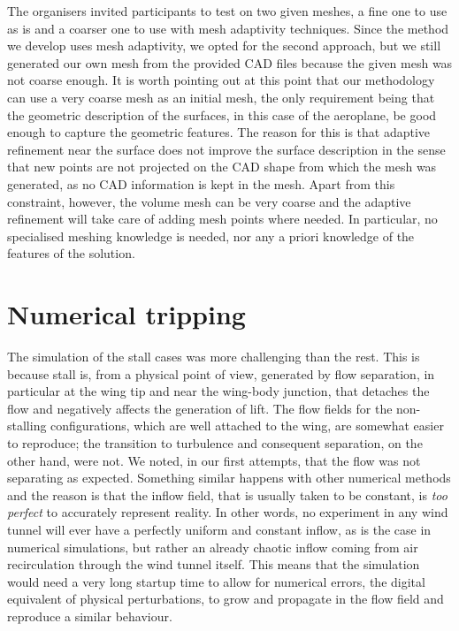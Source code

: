 The organisers invited participants to test on two given meshes, a fine one to use as is and a coarser one to use with mesh adaptivity techniques.
Since the method we develop uses mesh adaptivity, we opted for the second approach, but we still generated our own mesh from the provided CAD files because the given mesh was not coarse enough.
It is worth pointing out at this point that our methodology can use a very coarse mesh as an initial mesh, the only requirement being that the geometric description of the surfaces, in this case of the aeroplane, be good enough to capture the geometric features.
The reason for this is that adaptive refinement near the surface does not improve the surface description in the sense that new points are not projected on the CAD shape from which the mesh was generated, as no CAD information is kept in the mesh.
Apart from this constraint, however, the volume mesh can be very coarse and the adaptive refinement will take care of adding mesh points where needed.
In particular, no specialised meshing knowledge is needed, nor any a priori knowledge of the features of the solution.

\section{Numerical tripping}
\label{sec_tripping}
The simulation of the stall cases was more challenging than the rest.
This is because stall is, from a physical point of view, generated by flow separation, in particular at the wing tip and near the wing-body junction, that detaches the flow and negatively affects the generation of lift.
The flow fields for the non-stalling configurations, which are well attached to the wing, are somewhat easier to reproduce; the transition to turbulence and consequent separation, on the other hand, were not.
We noted, in our first attempts, that the flow was not separating as expected.
Something similar happens with other numerical methods and the reason is that the inflow field, that is usually taken to be constant, is \emph{too perfect} to accurately represent reality.
In other words, no experiment in any wind tunnel will ever have a perfectly uniform and constant inflow, as is the case in numerical simulations, but rather an already chaotic inflow coming from air recirculation through the wind tunnel itself.
This means that the simulation would need a very long startup time to allow for numerical errors, the digital equivalent of physical perturbations, to grow and propagate in the flow field and reproduce a similar behaviour.

